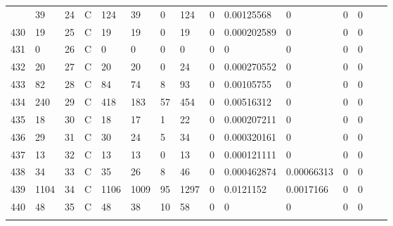 \begin{longtable}{lllllllllllllll}
\begin{comment}
	429 & 39                & 24  & C   & 124               & 39                & 0                 & 124  & 0          & 0.00125568     & 0              & 0             & 0            \\
	430 & 19                & 25  & C   & 19                & 19                & 0                 & 19   & 0          & 0.000202589    & 0              & 0             & 0            \\
	431 & 0                 & 26  & C   & 0                 & 0                 & 0                 & 0    & 0          & 0              & 0              & 0             & 0            \\
	432 & 20                & 27  & C   & 20                & 20                & 0                 & 24   & 0          & 0.000270552    & 0              & 0             & 0            \\
	433 & 82                & 28  & C   & 84                & 74                & 8                 & 93   & 0          & 0.00105755     & 0              & 0             & 0            \\
	434 & 240               & 29  & C   & 418               & 183               & 57                & 454  & 0          & 0.00516312     & 0              & 0             & 0            \\
	435 & 18                & 30  & C   & 18                & 17                & 1                 & 22   & 0          & 0.000207211    & 0              & 0             & 0            \\
	436 & 29                & 31  & C   & 30                & 24                & 5                 & 34   & 0          & 0.000320161    & 0              & 0             & 0            \\
	437 & 13                & 32  & C   & 13                & 13                & 0                 & 13   & 0          & 0.000121111    & 0              & 0             & 0            \\
	438 & 34                & 33  & C   & 35                & 26                & 8                 & 46   & 0          & 0.000462874    & 0.00066313     & 0             & 0            \\
	439 & 1104              & 34  & C   & 1106              & 1009              & 95                & 1297 & 0          & 0.0121152      & 0.0017166      & 0             & 0            \\
	440 & 48                & 35  & C   & 48                & 38                & 10                & 58   & 0          & 0              & 0              & 0             & 0            \\

\end{comment}
\end{longtable}
